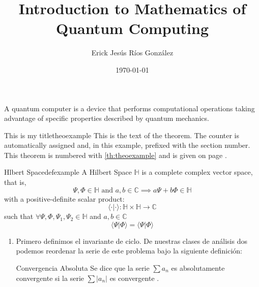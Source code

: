 \documentclass{article}
\title{Introduction to Mathematics of Quantum Computing}
\author{Erick Jesús Ríos González}
\date{\today}
\begin{document}
\maketitle
\noindent A quantum computer is a device that performs computational operations 
taking advantage of specific properties described by quantum mechanics.
\begin{mytheo}{This is my title}{theoexample}
    This is the text of the theorem. The counter is automatically assigned and,
    in this example, prefixed with the section number. This theorem is numbered with
    \ref{th:theoexample} and is given on page \pageref{th:theoexample}.
\end{mytheo}
\begin{mydef}{Hlbert Space}{defexample}
    A Hilbert Space $\mathbb{H}$ is a complete complex vector space, that is,
    \begin{equation}
        \Psi,\Phi \in \mathbb{H} \text{ and } a,b \in \mathbb{C} \implies a\Psi+b\Phi \in \mathbb{H}
    \end{equation}
    with a positive-definite scalar product:
    \begin{equation}
        \langle\cdot|\cdot\rangle: \mathbb{H}\times\mathbb{H}\to \mathbb{C}
    \end{equation}
    such that $\forall \Psi,\Phi, \Psi_1, \Psi_2 \in \mathbb{H}$ and $a,b \in \mathbb{C}$
    \begin{equation*}
        \langle\Psi|\Phi\rangle = {\langle\Psi|\Phi\rangle}
    \end{equation*}
    \begin{enumerate}
        \item Primero definimos el invariante de ciclo. De nuestras clases de análisis dos podemos reordenar la serie de este problema bajo la siguiente definición:
    \begin{mydef}{Convergencia Absoluta}{}
        Se dice que la serie $\sum a_{n}$ es absolutamente convergente si la serie $\sum\left\vert a_{n}\right\vert$ es convergente . 
    

\end{mydef}
\end{enumerate}
\end{mydef}
\end{document}
